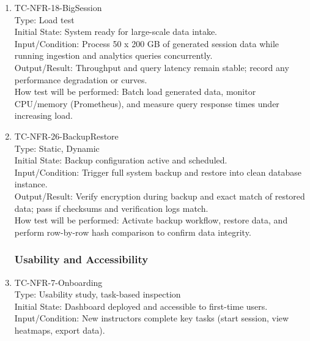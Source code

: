 \documentclass[12pt, titlepage]{article}
\begin{document}
\begin{enumerate}
\item{TC-NFR-18-BigSession\\}
Type: Load test\\

Initial State: System ready for large-scale data intake.\\

Input/Condition: Process 50 x 200 GB of generated session data while running ingestion and analytics queries concurrently.\\

Output/Result: Throughput and query latency remain stable; record any performance degradation or curves.\\

How test will be performed: Batch load generated data, monitor CPU/memory (Prometheus), and measure query response times under increasing load.

\item{TC-NFR-26-BackupRestore\\}
Type: Static, Dynamic\\

Initial State: Backup configuration active and scheduled.\\

Input/Condition: Trigger full system backup and restore into clean database instance.\\

Output/Result: Verify encryption during backup and exact match of restored data; pass if checksums and verification logs match.\\

How test will be performed: Activate backup workflow, restore data, and perform row-by-row hash comparison to confirm data integrity.

\subsubsection{Usability and Accessibility}

\item{TC-NFR-7-Onboarding\\}
Type: Usability study, task-based inspection\\

Initial State: Dashboard deployed and accessible to first-time users.\\

Input/Condition: New instructors complete key tasks (start session, view heatmaps, export data).\\


\end{enumerate}
\end{document}
